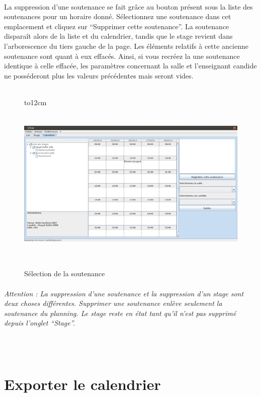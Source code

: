 \documentclass[a4paper,10pt]{report}
\begin{document}
      \paragraph{}
	La suppression d'une soutenance se fait grâce au bouton présent sous la liste des soutenances pour un horaire donné.
	Sélectionnez une soutenance dans cet emplacement et cliquez sur ``Supprimer cette soutenance''.
	La soutenance disparaît alors de la liste et du calendrier, tandis que le stage revient dans l'arborescence du tiers gauche de la page.
	Les éléments relatifs à cette ancienne soutenance sont quant à eux effacés.
	Ainsi, si vous recréez la une soutenance identique à celle effacée, les paramètres concernant la salle et l'enseignant candide ne posséderont plus les valeurs précédentes mais seront vides.
	~\\~\\
	\begin{figure}[H]
	   \hbox to12cm{\hss\includegraphics[height=8cm,width=18cm]{../general/suppression.png}\hss}
	   \caption{Sélection de la soutenance}
	 \end{figure}
	
	
      \paragraph{}
	\textit{Attention : La suppression d'une soutenance et la suppression d'un stage sont deux choses différentes. Supprimer une soutenance enlève seulement la soutenance du planning. Le stage reste en état tant qu'il n'est pas supprimé depuis l'onglet ``Stage''.}
      
      ~\\~\\
    \section{Exporter le calendrier}
\end{document}
